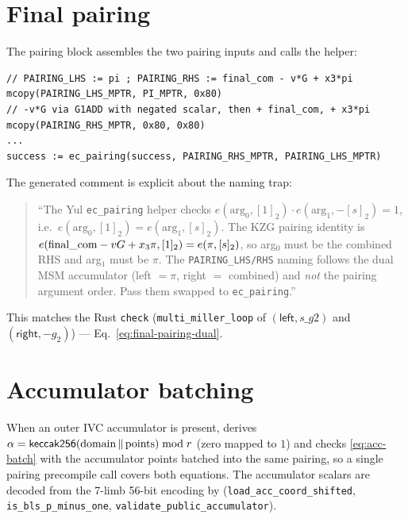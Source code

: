 \section{Final pairing}
\label{sec:pairing-codegen}

The pairing block assembles the two pairing inputs and calls the helper:
\begin{lstlisting}[style=yul]
// PAIRING_LHS := pi ; PAIRING_RHS := final_com - v*G + x3*pi
mcopy(PAIRING_LHS_MPTR, PI_MPTR, 0x80)
// -v*G via G1ADD with negated scalar, then + final_com, + x3*pi
mcopy(PAIRING_RHS_MPTR, 0x80, 0x80)
...
success := ec_pairing(success, PAIRING_RHS_MPTR, PAIRING_LHS_MPTR)
\end{lstlisting}
The generated comment is explicit about the naming trap:
\begin{quote}\small
``The Yul \texttt{ec\_\allowbreak{}pairing} helper checks $e(\text{arg}_0,[1]_2)\cdot
e(\text{arg}_1,-[s]_2)=1$, i.e.\ $e(\text{arg}_0,[1]_2)=e(\text{arg}_1,[s]_2)$.
The KZG pairing identity is $e(\text{final\_\allowbreak{}com}-vG+x_3\pi,[1]_2) =
e(\pi,[s]_2)$, so arg$_0$ must be the combined RHS and arg$_1$ must be
$\pi$. The \texttt{PAIRING\_\allowbreak{}LHS/RHS} naming follows the dual MSM
accumulator (left $=\pi$, right $=$ combined) and \emph{not} the pairing
argument order. Pass them swapped to \texttt{ec\_\allowbreak{}pairing}.''
\end{quote}
This matches the Rust  \texttt{check}
(\texttt{multi\_\allowbreak{}miller\_\allowbreak{}loop} of $(\mathsf{left}, s\_\allowbreak{}g2)$ and
$(\mathsf{right}, -g_2)$) --- Eq.~\eqref{eq:final-pairing-dual}.

\section{Accumulator batching}
\label{sec:sol-acc}

When an outer IVC accumulator is present,  derives
$\alpha = \mathsf{keccak256}(\text{domain}\,\|\,\text{points})\bmod r$ (zero mapped
to $1$) and checks \eqref{eq:acc-batch} with the accumulator points
batched into the same pairing, so a single pairing precompile call covers
both equations. The accumulator scalars are decoded from the 7-limb
56-bit encoding by 
(\texttt{load\_\allowbreak{}acc\_\allowbreak{}coord\_\allowbreak{}shifted}, \texttt{is\_\allowbreak{}bls\_\allowbreak{}p\_\allowbreak{}minus\_\allowbreak{}one},
\texttt{validate\_\allowbreak{}public\_\allowbreak{}accumulator}).

